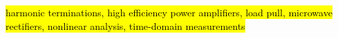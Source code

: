 \begin{IEEEkeywords}
\hl{harmonic terminations, high efficiency power amplifiers, load pull, microwave rectifiers, nonlinear analysis, time-domain measurements}
\end{IEEEkeywords}






%
\IEEEpeerreviewmaketitle













